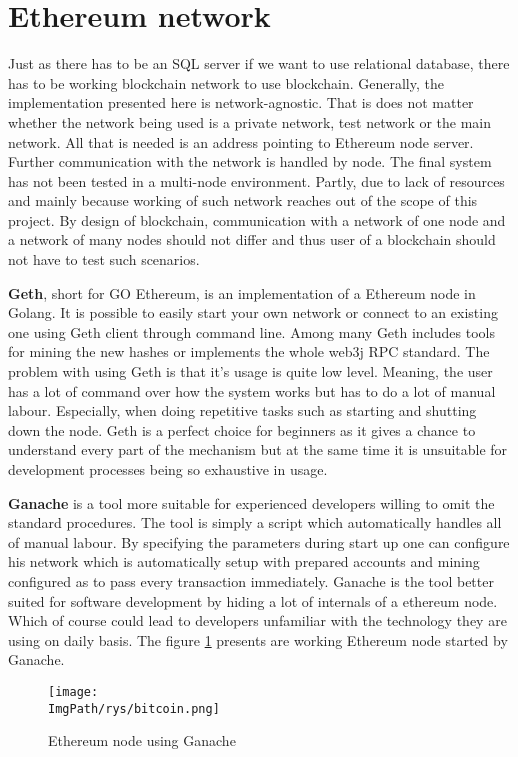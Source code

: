 \documentclass[a4paper,12pt,twoside,openany]{report}
\newcommand{\ImgPath}{.}
\begin{document}
\section{Ethereum network}

Just as there has to be an SQL server if we want to use relational database, there has to be working blockchain network to use blockchain. Generally, the implementation presented here is network-agnostic. That is does not matter whether the network being used is a private network, test network or the main network. All that is needed is an address pointing to Ethereum node server. Further communication with the network is handled by node. The final system has not been tested in a multi-node environment. Partly, due to lack of resources and mainly because working of such network reaches out of the scope of this project. By design of blockchain, communication with a network of one node and a network of many nodes should not differ and thus user of a blockchain should not have to test such scenarios.

\textbf{Geth}, short for GO Ethereum, is an implementation of a Ethereum node in Golang. It is possible to easily start your own network or connect to an existing one using Geth client through command line. Among many Geth includes tools for mining the new hashes or implements the whole web3j RPC standard.  The problem with using Geth is that it's usage is quite low level. Meaning, the user has a lot of command over how the system works but has to do a lot of manual labour. Especially, when doing repetitive tasks such as starting and shutting down the node. Geth is a perfect choice for beginners as it gives a chance to understand every part of the mechanism but at the same time it is unsuitable for development processes being so exhaustive in usage.

\textbf{Ganache} is a tool more suitable for experienced developers willing to omit the standard procedures. The tool is simply a script which automatically handles all of manual labour. By specifying the parameters during start up one can configure his network which is automatically setup with prepared accounts and mining configured as to pass every transaction immediately. Ganache is the tool better suited for software development by hiding a lot of internals of a ethereum node. Which of course could lead to developers unfamiliar with the technology they are using on daily basis. The figure \ref{ganache} presents are working Ethereum node started by Ganache.

\begin{figure}[!htbp]
	\begin{center}
\centering
\texttt{[image: \\ImgPath/rys/bitcoin.png]}
\end{center}
	\caption{Ethereum node using Ganache}
	\label{ganache}
\end{figure}
\end{document}
